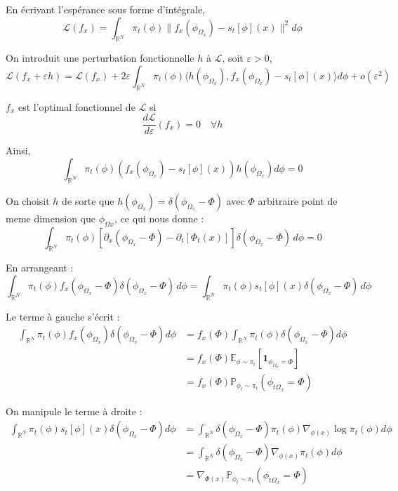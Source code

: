 \documentclass[a4paper,10pt]{article}
\theoremstyle{definition} %
\theoremstyle{definition} %
\theoremstyle{definition} %
\theoremstyle{definition} %
\begin{document}
En écrivant l'espérance sous forme d'intégrale,
\[ \mathcal{L}(f_x) = \int_{\mathbb{R}^N} \pi_t(\phi) \| f_x(\phi_{\Omega_x}) - s_t[\phi](x) \|^2 d\phi \]

On introduit une perturbation fonctionnelle $h$ à $\mathcal{L}$, soit $\varepsilon > 0$,
\[ \mathcal{L}(f_x + \varepsilon h) = \mathcal{L}(f_x) + 2\varepsilon \int_{\mathbb{R}^N} \pi_t(\phi) \langle h(\phi_{\Omega_x}), f_x(\phi_{\Omega_x}) - s_t[\phi](x) \rangle d\phi + o(\varepsilon^2) \]

$f_x$ est l'optimal fonctionnel de $\mathcal{L}$ si
\[ \frac{d\mathcal{L}}{d\varepsilon}(f_x) = 0 \quad \forall h \]

Ainsi,
\[ \int_{\mathbb{R}^N} \pi_t(\phi) (f_x(\phi_{\Omega_x}) - s_t[\phi](x)) h(\phi_{\Omega_x}) d\phi = 0 \]

On choisit $h$ de sorte que $h(\phi_{\Omega_x}) = \delta(\phi_{\Omega_x} - \Phi)$ avec $\Phi$ arbitraire point de meme dimension que $\phi_{\Omega x}$, ce qui nous donne :
\[
\int_{\mathbb{R}^N} \pi_t (\phi) \left[ \partial_x (\phi_{\Omega_x} - \Phi) - \partial_t \left[ \Phi_t(x) \right] \right] \delta(\phi_{\Omega_x} - \Phi) \, d\phi = 0
\]

En arrangeant :
\[
\int_{\mathbb{R}^N} \pi_t (\phi) f_x (\phi_{\Omega_x} - \Phi) \delta(\phi_{\Omega_x} - \Phi) \, d\phi
= \int_{\mathbb{R}^N} \pi_t (\phi) s_t[\phi](x)\delta(\phi_{\Omega_x} - \Phi) \, d\phi
\]

Le terme à gauche s'écrit :
\begin{align*}
\int_{\mathbb{R}^N} \pi_t(\phi) f_x(\phi_{\Omega_x}) \delta(\phi_{\Omega_x} - \Phi) d\phi &= f_x(\Phi) \int_{\mathbb{R}^N} \pi_t(\phi) \delta(\phi_{\Omega_x} - \Phi) d\phi \\
&= f_x(\Phi) \mathbb{E}_{\phi \sim \pi_t} \left[ \mathbf{1}_{\phi_{\Omega_x} = \Phi} \right] \\
&= f_x(\Phi) \mathbb{P}_{\phi_t \sim \pi_t} (\phi_{t \Omega_x} = \Phi)
\end{align*}

On manipule le terme à droite :
\begin{align*}
\int_{\mathbb{R}^N} \pi_t(\phi) s_t[\phi](x) \delta(\phi_{\Omega_x} - \Phi) d\phi &= \int_{\mathbb{R}^N} \delta(\phi_{\Omega_x} - \Phi) \pi_t(\phi) \nabla_{\phi(x)} \log \pi_t(\phi) d\phi \\
&= \int_{\mathbb{R}^N} \delta(\phi_{\Omega_x} - \Phi) \nabla_{\phi(x)} \pi_t(\phi) d\phi \\
&= \nabla_{\Phi(x)} \mathbb{P}_{\phi_t \sim \pi_t} (\phi_{t \Omega_x} = \Phi)
\end{align*}
\end{document}
